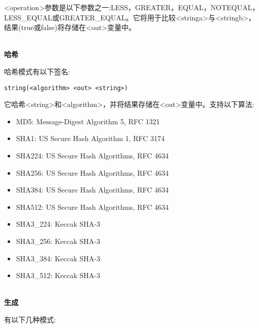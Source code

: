 <operation>参数是以下参数之一:LESS，GREATER，EQUAL，NOTEQUAL，LESS\_EQUAL或GREATER\_EQUAL。它将用于比较<stringa>与<stringb>，结果(true或false)将存储在<out>变量中。

\hspace*{\fill} \\ %
\noindent
\textbf{哈希}

哈希模式有以下签名:

\begin{lstlisting}[style=styleCMake]
string(<algorithm> <out> <string>)
\end{lstlisting}

它哈希<string>和<algorithm>，并将结果存储在<out>变量中。支持以下算法:

\begin{itemize}
\item 
MD5: Message-Digest Algorithm 5, RFC 1321

\item 
SHA1: US Secure Hash Algorithm 1, RFC 3174

\item 
SHA224: US Secure Hash Algorithms, RFC 4634

\item 
SHA256: US Secure Hash Algorithms, RFC 4634

\item
SHA384: US Secure Hash Algorithms, RFC 4634

\item
SHA512: US Secure Hash Algorithms, RFC 4634

\item
SHA3\_224: Keccak SHA-3

\item
SHA3\_256: Keccak SHA-3

\item 
SHA3\_384: Keccak SHA-3

\item 
SHA3\_512: Keccak SHA-3
\end{itemize}

\hspace*{\fill} \\ %
\noindent
\textbf{生成}

有以下几种模式:

